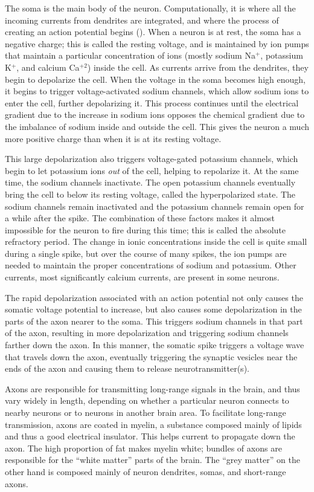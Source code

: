 The soma is the main body of the neuron.
Computationally, it is where all the incoming currents from dendrites
are integrated,
and where the process of creating an action potential begins ().
When a neuron is at rest, the soma has a negative charge;
this is called the resting voltage,
and is maintained by ion pumps that maintain a particular concentration of ions
(mostly sodium Na$^+$, potassium K$^+$, and calcium Ca$^{+2}$) inside the cell.
As currents arrive from the dendrites,
they begin to depolarize the cell.
When the voltage in the soma becomes high enough,
it begins to trigger voltage-activated sodium channels,
which allow sodium ions to enter the cell, further depolarizing it.
This process continues until the electrical gradient
due to the increase in sodium ions
opposes the chemical gradient due to the imbalance of sodium
inside and outside the cell.
This gives the neuron a much more positive charge
than when it is at its resting voltage.

This large depolarization also triggers voltage-gated potassium channels,
which begin to let potassium ions \emph{out} of the cell,
helping to repolarize it.
At the same time, the sodium channels inactivate.
The open potassium channels eventually bring the cell to below its resting voltage,
called the hyperpolarized state.
The sodium channels remain inactivated and the potassium channels remain open
for a while after the spike.
The combination of these factors makes it almost impossible
for the neuron to fire during this time;
this is called the absolute refractory period.
The change in ionic concentrations inside the cell is quite small
during a single spike,
but over the course of many spikes,
the ion pumps are needed to maintain the proper concentrations
of sodium and potassium.
Other currents, most significantly calcium currents,
are present in some neurons.

The rapid depolarization associated with an action potential
not only causes the somatic voltage potential to increase,
but also causes some depolarization in the parts of the axon
nearer to the soma.
This triggers sodium channels in that part of the axon,
resulting in more depolarization and
triggering sodium channels farther down the axon.
In this manner, the somatic spike triggers a voltage wave
that travels down the axon,
eventually triggering the synaptic vesicles near the ends of the axon
and causing them to release neurotransmitter(s).

Axons are responsible for transmitting long-range signals in the brain,
and thus vary widely in length,
depending on whether a particular neuron connects to nearby neurons
or to neurons in another brain area.
To facilitate long-range transmission,
axons are coated in myelin,
a substance composed mainly of lipids and thus a good electrical insulator.
This helps current to propagate down the axon.
The high proportion of fat makes myelin white;
bundles of axons are responsible for the ``white matter'' parts of the brain.
The ``grey matter'' on the other hand
is composed mainly of neuron dendrites, somas, and short-range axons.

